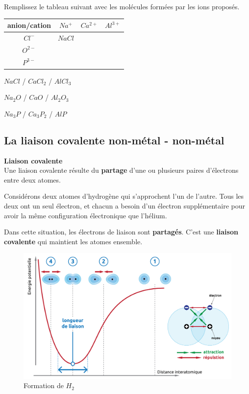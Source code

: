 \documentclass[
  11pt,
  french,
  a4paper,
  openany]{book}
\begin{document}
\begin{Exercise}
Remplissez le tableau suivant avec les molécules formées par les ions proposés.

\end{Exercise}

\begin{longtable}[]{@{}cccc@{}}
\toprule
anion/cation & \(Na^+\) & \(Ca^{2+}\) & \(Al^{3+}\)\tabularnewline
\midrule
\endhead
\(Cl^{-}\) & \(NaCl\) & &\tabularnewline
\(O^{2-}\) & & &\tabularnewline
\(P^{3-}\) & & &\tabularnewline
\bottomrule
\end{longtable}

\begin{Answer}
\(NaCl\) / \(CaCl_2\) / \(AlCl_3\)

\(Na_2O\) / \(CaO\) / \(Al_2O_3\)

\(Na_3P\) / \(Ca_3P_2\) / \(AlP\)

\end{Answer}

\newpage

\hypertarget{la-liaison-covalente-non-muxe9tal---non-muxe9tal}{%
\subsection{La liaison covalente \textbar{} non-métal - non-métal}\label{la-liaison-covalente-non-muxe9tal---non-muxe9tal}}

\begin{tcolorbox}
\textbf{Liaison covalente}\\
Une liaison covalente résulte du \textbf{partage} d'une ou plusieurs paires d'électrons entre deux atomes.

\end{tcolorbox}

Considérons deux atomes d'hydrogène qui s'approchent l'un de l'autre. Tous les deux ont un seul électron, et chacun a besoin d'un électron supplémentaire pour avoir la même configuration électronique que l'hélium.

Dans cette situation, les électrons de liaison sont \textbf{partagés}. C'est une \textbf{liaison covalente} qui maintient les atomes ensemble.

\begin{figure}

{\centering \includegraphics[width=0.5\linewidth]{images/H2-bond} 

}

\caption{Formation de $H_2$}\label{fig:H2-bond}
\end{figure}
\end{document}
